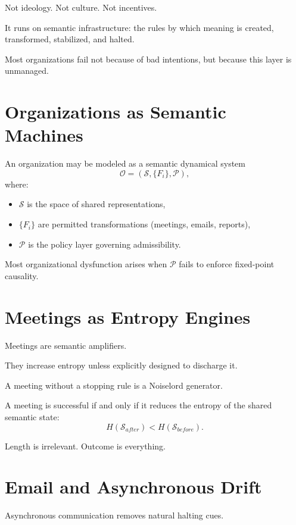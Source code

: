 \documentclass[11pt]{book}
\begin{document}
Not ideology.
Not culture.
Not incentives.

It runs on semantic infrastructure: the rules by which meaning is created,
transformed, stabilized, and halted.

Most organizations fail not because of bad intentions, but because this layer
is unmanaged.

\section{Organizations as Semantic Machines}

An organization may be modeled as a semantic dynamical system
\[
\mathcal{O} = (\mathcal{S}, \{F_i\}, \mathcal{P}),
\]
where:
\begin{itemize}
\item \(\mathcal{S}\) is the space of shared representations,
\item \(\{F_i\}\) are permitted transformations (meetings, emails, reports),
\item \(\mathcal{P}\) is the policy layer governing admissibility.
\end{itemize}

Most organizational dysfunction arises when \(\mathcal{P}\) fails to enforce
fixed-point causality.

\section{Meetings as Entropy Engines}

Meetings are semantic amplifiers.

They increase entropy unless explicitly designed to discharge it.

A meeting without a stopping rule is a Noiselord generator.

\begin{proposition}
A meeting is successful if and only if it reduces the entropy of the shared
semantic state:
\[
H(\mathcal{S}_{after}) < H(\mathcal{S}_{before}).
\]
\end{proposition}

Length is irrelevant.
Outcome is everything.

\section{Email and Asynchronous Drift}

Asynchronous communication removes natural halting cues.
\end{document}
